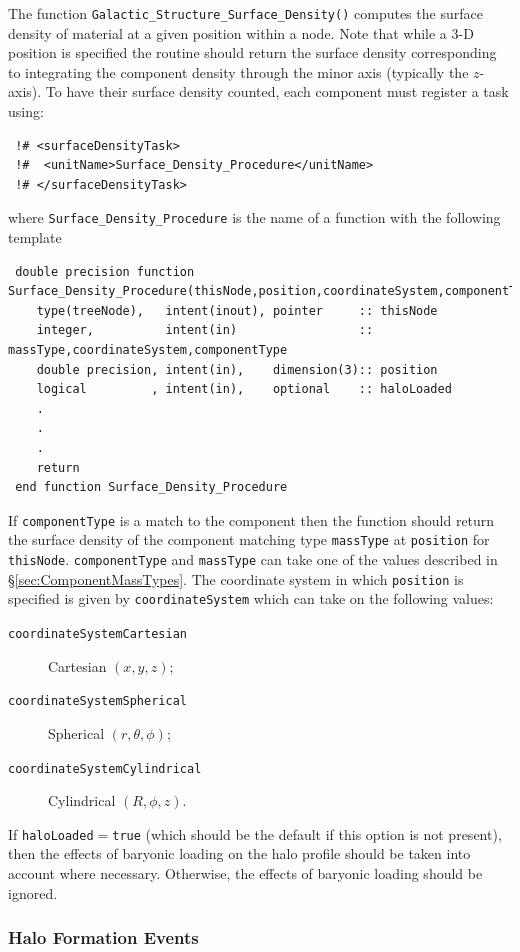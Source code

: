 The function {\tt Galactic\_Structure\_Surface\_Density()} computes the surface density of material at a given position within a node. Note that while a 3-D position is specified the routine should return the surface density corresponding to integrating the component density through the minor axis (typically the $z$-axis). To have their surface density counted, each component must register a task using:
\begin{verbatim}
 !# <surfaceDensityTask>
 !#  <unitName>Surface_Density_Procedure</unitName>
 !# </surfaceDensityTask>
\end{verbatim}
where {\tt Surface\_Density\_Procedure} is the name of a function with the following template
\begin{verbatim}
 double precision function Surface_Density_Procedure(thisNode,position,coordinateSystem,componentType,massType,haloLoaded)
    type(treeNode),   intent(inout), pointer     :: thisNode
    integer,          intent(in)                 :: massType,coordinateSystem,componentType
    double precision, intent(in),    dimension(3):: position
    logical         , intent(in),    optional    :: haloLoaded
    .
    .
    .
    return
 end function Surface_Density_Procedure
\end{verbatim}
If {\tt componentType} is a match to the component then the function should return the surface density of the component matching type {\tt massType} at {\tt position} for {\tt thisNode}. {\tt componentType} and {\tt massType} can take one of the values described in \S\ref{sec:ComponentMassTypes}.
The coordinate system in which {\tt position} is specified is given by {\tt coordinateSystem} which can take on the following values:
\begin{description}
 \item [{\tt coordinateSystemCartesian}] Cartesian $(x,y,z)$;
 \item [{\tt coordinateSystemSpherical}] Spherical $(r,\theta,\phi)$;
 \item [{\tt coordinateSystemCylindrical}] Cylindrical $(R,\phi,z)$.
\end{description}
If {\tt haloLoaded}$=${\tt true} (which should be the default if this option is not present), then the effects of baryonic loading on the halo profile should be taken into account where necessary. Otherwise, the effects of baryonic loading should be ignored.

\subsubsection{Halo Formation Events}\label{sec:HaloFormationEvents}

